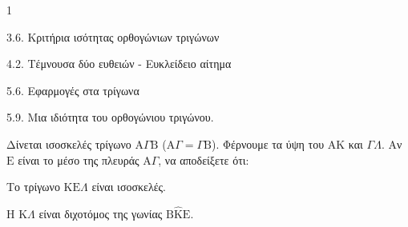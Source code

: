 \begin{ylh}{1}
    \item 3.6. Κριτήρια ισότητας ορθογώνιων τριγώνων
    \item 4.2. Τέμνουσα δύο ευθειών - Ευκλείδειο αίτημα
    \item 5.6. Εφαρμογές στα τρίγωνα
    \item 5.9. Μια ιδιότητα του ορθογώνιου τριγώνου.
\end{ylh}
Δίνεται ισοσκελές τρίγωνο $\mathrm{A}\Gamma\mathrm{B}$ ($\mathrm{A}\Gamma = \Gamma\mathrm{B}$). Φέρνουμε τα ύψη του $\mathrm{A}\mathrm{K}$ και $\Gamma\Lambda$. Αν $\mathrm{E}$ είναι το μέσο της πλευράς $\mathrm{A}\Gamma$, να αποδείξετε ότι:
\begin{alist}
    \item Tο τρίγωνο $\mathrm{K}\mathrm{E}\Lambda$ είναι ισοσκελές. 
    \item H $\mathrm{K}\Lambda$ είναι διχοτόμος της γωνίας $\mathrm{B}\hat{\mathrm{K}}\mathrm{E}$. 
\end{alist}
